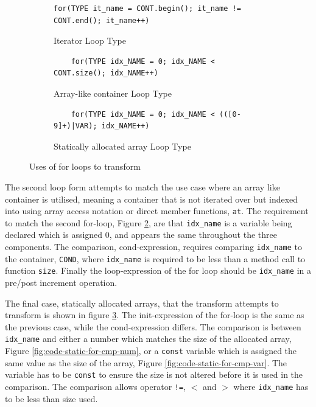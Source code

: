 \documentclass[bsc,frontabs,singlespacing,twoside,parskip,deptreport]{infthesis}
\begin{document}
\begin{figure}[h]
    \centering
    \begin{subfigure}[h]{\textwidth}
        \centering
        \begin{verbatim}
for(TYPE it_name = CONT.begin(); it_name != CONT.end(); it_name++)
        \end{verbatim}
        \caption{Iterator Loop Type }
        \label{fig:code-for-iter}
        \vspace{0.2cm}
    \end{subfigure}
    
    \begin{subfigure}[h]{\textwidth}
    \begin{verbatim}
    for(TYPE idx_NAME = 0; idx_NAME < CONT.size(); idx_NAME++)
    \end{verbatim}
    \caption{Array-like container Loop Type}
    \centering
    \vspace{0.2cm}
    \label{fig:code-for-container}
    \end{subfigure}

    \begin{subfigure}[h]{\textwidth}
    \begin{verbatim}
    for(TYPE idx_NAME = 0; idx_NAME < (([0-9]+)|VAR); idx_NAME++)
    \end{verbatim}
    \caption{Statically allocated array Loop Type}
    \centering
    \label{fig:code-for-stat}
    \end{subfigure}
    
    \caption{Uses of for loops to transform}
    \label{fig:code-for-types}
\end{figure}


The second loop form attempts to match the use case where an array like container is utilised, meaning a container that is not iterated over but indexed into using array access notation or direct member functions, \texttt{at}. The requirement to match the second for-loop, Figure \ref{fig:code-for-container}, are that \texttt{idx\_name} is a variable being declared which is assigned 0, and appears the same throughout the three components. The comparison, cond-expression, requires comparing \texttt{idx\_name} to the container, \texttt{COND}, where \texttt{idx\_name} is required to be less than a method call to function \texttt{size}. Finally the loop-expression of the for loop should be \texttt{idx\_name} in a pre/post increment operation.

The final case, statically allocated arrays, that the transform attempts to transform is shown in figure \ref{fig:code-for-stat}. The init-expression of the for-loop is the same as the previous case, while the cond-expression differs. The comparison is between \texttt{idx\_name} and either a number which matches the size of the allocated array, Figure \ref{fig:code-static-for-cmp-num}, or a \texttt{const} variable which is assigned the same value as the size of the array, Figure \ref{fig:code-static-for-cmp-var}. The variable has to be \texttt{const} to ensure the size is not altered before it is used in the comparison. The comparison allows operator \texttt{!=}, $<$ and $>$ where \texttt{idx\_name} has to be less than size used. 
\end{document}

